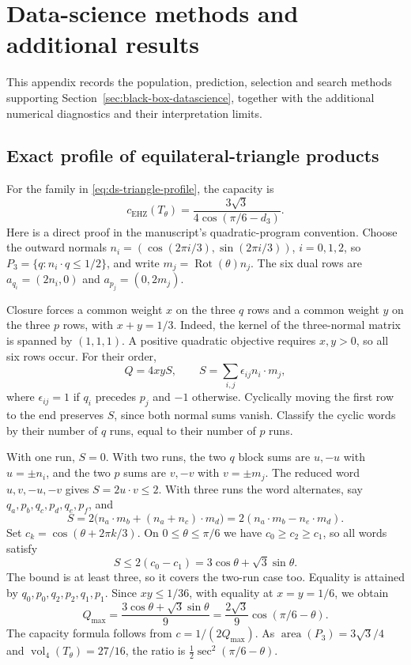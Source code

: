 \section{Data-science methods and additional results}\label{app:datascience-results}

This appendix records the population, prediction, selection and search
methods supporting Section~\ref{sec:black-box-datascience}, together with
the additional numerical diagnostics and their interpretation limits.

\subsection{Exact profile of equilateral-triangle products}
\label{app:ds-triangle-profile}

For the family in \eqref{eq:ds-triangle-profile}, the capacity is
\[
 c_{\mathrm{EHZ}}(T_\theta)=\frac{3\sqrt3}{4\cos(\pi/6-d_3)}.
\]
Here is a direct proof in the manuscript's quadratic-program convention.
Choose the outward normals
$n_i=(\cos(2\pi i/3),\sin(2\pi i/3))$, $i=0,1,2$, so
$P_3=\{q:n_i\cdot q\leq1/2\}$, and write
$m_j=\operatorname{Rot}(\theta)n_j$. The six dual rows are
$a_{q_i}=(2n_i,0)$ and $a_{p_j}=(0,2m_j)$.

Closure forces a common weight $x$ on the three $q$ rows and a common
weight $y$ on the three $p$ rows, with $x+y=1/3$. Indeed, the kernel of
the three-normal matrix is spanned by $(1,1,1)$. A positive quadratic
objective requires $x,y>0$, so all six rows occur. For their order,
\[
 Q=4xyS,\qquad
 S=\sum_{i,j}\epsilon_{ij}n_i\cdot m_j,
\]
where $\epsilon_{ij}=1$ if $q_i$ precedes $p_j$ and $-1$ otherwise.
Cyclically moving the first row to the end preserves $S$, since both
normal sums vanish. Classify the cyclic words by their number of $q$
runs, equal to their number of $p$ runs.

With one run, $S=0$. With two runs, the two $q$ block sums are $u,-u$
with $u=\pm n_i$, and the two $p$ sums are $v,-v$ with $v=\pm m_j$.
The reduced word $u,v,-u,-v$ gives $S=2u\cdot v\leq2$. With three
runs the word alternates, say $q_a,p_b,q_c,p_d,q_e,p_f$, and
\[
 S=2\bigl(n_a\cdot m_b+(n_a+n_c)\cdot m_d\bigr)
  =2(n_a\cdot m_b-n_e\cdot m_d).
\]
Set $c_k=\cos(\theta+2\pi k/3)$. On $0\leq\theta\leq\pi/6$ we have
$c_0\geq c_2\geq c_1$, so all words satisfy
\[
 S\leq2(c_0-c_1)=3\cos\theta+\sqrt3\sin\theta.
\]
The bound is at least three, so it covers the two-run case too. Equality
is attained by $q_0,p_0,q_2,p_2,q_1,p_1$. Since $xy\leq1/36$, with
equality at $x=y=1/6$, we obtain
\[
 Q_{\max}=\frac{3\cos\theta+\sqrt3\sin\theta}{9}
         =\frac{2\sqrt3}{9}\cos(\pi/6-\theta).
\]
The capacity formula follows from $c=1/(2Q_{\max})$. As
$\operatorname{area}(P_3)=3\sqrt3/4$ and
$\operatorname{vol}_4(T_\theta)=27/16$, the ratio is
$\tfrac12\sec^2(\pi/6-\theta)$.


